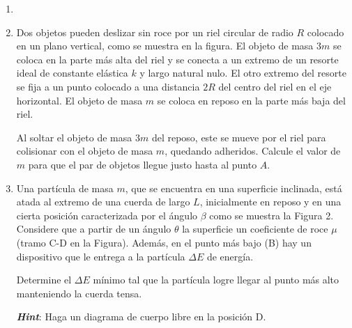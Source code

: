 \documentclass[letterpaper,11pt]{article}
\begin{document}
\vspace{-1cm}
\begin{enumerate}\setlength{\itemsep}{0.4cm}


\item[]

% 

\item Dos objetos pueden deslizar sin roce por un riel circular de radio $R$ colocado en un plano vertical, como se muestra en la figura. El objeto de masa $3m$ se coloca en la parte más alta del riel y se conecta a un extremo de un resorte ideal de constante elástica $k$ y largo natural nulo. El otro extremo del resorte se fija a un punto colocado a una distancia $2R$ del centro del riel en el eje horizontal. El objeto de masa $m$ se coloca en reposo en la parte más baja del riel.

Al soltar el objeto de masa $3m$ del reposo, este se mueve por el riel para colisionar con el objeto de masa $m$, quedando adheridos. Calcule el valor de $m$ para que el par de objetos llegue justo hasta al punto $A$.

%   

\item Una partícula de masa $m$, que se encuentra en una superficie inclinada, está atada al extremo de una cuerda de largo $L$, inicialmente en reposo y en una cierta posición caracterizada por el ángulo $\beta$ como se muestra la Figura 2. Considere que a partir de un ángulo $\theta$ la superficie un coeficiente de roce $\mu$ (tramo C-D en la Figura). Además, en el punto más bajo (B) hay un dispositivo que le entrega a la partícula $\Delta E$ de energía.

Determine el $\Delta E$ mínimo tal que la partícula logre llegar al punto más alto manteniendo la cuerda tensa.

\textbf{\textit{Hint}}: Haga un diagrama de cuerpo libre en la posición D. 


\end{enumerate}
\end{document}
